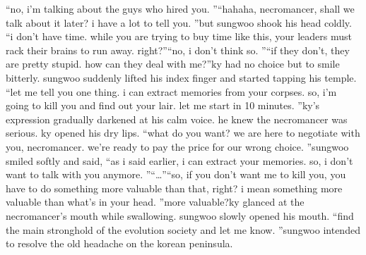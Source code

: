“no, i’m talking about the guys who hired you.
”“hahaha, necromancer, shall we talk about it later? i have a lot to tell you.
”but sungwoo shook his head coldly.
“i don’t have time.
 while you are trying to buy time like this, your leaders must rack their brains to run away.
 right?”“no, i don’t think so.
”“if they don’t, they are pretty stupid.
 how can they deal with me?”ky had no choice but to smile bitterly.
sungwoo suddenly lifted his index finger and started tapping his temple.
“let me tell you one thing.
 i can extract memories from your corpses.
 so, i’m going to kill you and find out your lair.
 let me start in 10 minutes.
”ky’s expression gradually darkened at his calm voice.
 he knew the necromancer was serious.
ky opened his dry lips.
“what do you want? we are here to negotiate with you, necromancer.
 we’re ready to pay the price for our wrong choice.
”sungwoo smiled softly and said, “as i said earlier, i can extract your memories.
 so, i don’t want to talk with you anymore.
”“…”“so, if you don’t want me to kill you, you have to do something more valuable than that, right? i mean something more valuable than what’s in your head.
”more valuable?ky glanced at the necromancer’s mouth while swallowing.
sungwoo slowly opened his mouth.
“find the main stronghold of the evolution society and let me know.
”sungwoo intended to resolve the old headache on the korean peninsula.


 